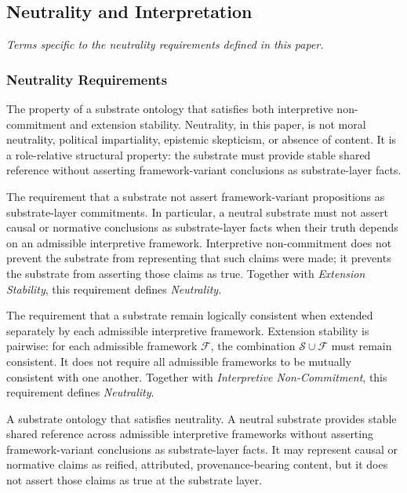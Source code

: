 \subsection*{Neutrality and Interpretation}
\textit{Terms specific to the neutrality requirements defined in this paper.}

\subsubsection*{Neutrality Requirements}

\begin{description}[style=nextline,leftmargin=1.5cm]

\item[Neutrality]
The property of a substrate ontology that satisfies
both interpretive non-commitment and extension stability.
Neutrality, in this paper, is not moral neutrality,
political impartiality, epistemic skepticism,
or absence of content.
It is a role-relative structural property:
the substrate must provide stable shared reference
without asserting framework-variant conclusions
as substrate-layer facts.

\item[Interpretive Non-Commitment]
The requirement that a substrate not assert
framework-variant propositions as substrate-layer commitments.
In particular, a neutral substrate must not assert
causal or normative conclusions as substrate-layer facts
when their truth depends on an admissible interpretive framework.
Interpretive non-commitment does not prevent the substrate
from representing that such claims were made;
it prevents the substrate from asserting those claims as true.
Together with \emph{Extension Stability}, this requirement
defines \emph{Neutrality}.

\item[Extension Stability]
The requirement that a substrate remain logically consistent
when extended separately by each admissible interpretive framework.
Extension stability is pairwise:
for each admissible framework $\mathcal{F}$,
the combination $\mathcal{S} \cup \mathcal{F}$
must remain consistent.
It does not require all admissible frameworks
to be mutually consistent with one another.
Together with \emph{Interpretive Non-Commitment},
this requirement defines \emph{Neutrality}.

\item[Neutral Substrate]
A substrate ontology that satisfies neutrality.
A neutral substrate provides stable shared reference
across admissible interpretive frameworks
without asserting framework-variant conclusions
as substrate-layer facts.
It may represent causal or normative claims
as reified, attributed, provenance-bearing content,
but it does not assert those claims as true
at the substrate layer.


\end{description}
